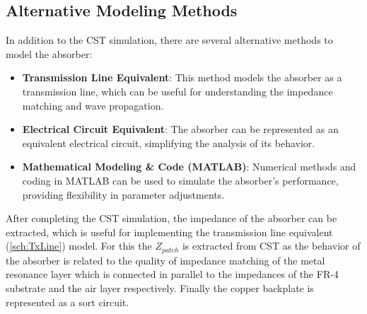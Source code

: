     \subsection{\textsf{Alternative Modeling Methods}}

        In addition to the CST simulation, there are several alternative methods
        to model the absorber:
        \begin{itemize}
            \item \textbf{Transmission Line Equivalent}: This method models the 
                absorber as a transmission line, which can be useful for 
                understanding the impedance matching and wave propagation.
            \item \textbf{Electrical Circuit Equivalent}: The absorber can be 
                represented as an equivalent electrical circuit, simplifying the
                analysis of its behavior.
            \item \textbf{Mathematical Modeling \& Code (MATLAB)}: Numerical methods
                and coding in MATLAB can be used to simulate the absorber's 
                performance, providing flexibility in parameter adjustments.
        \end{itemize}
    
        After completing the CST simulation, the impedance of the absorber can be 
        extracted, which is useful for implementing the transmission line equivalent 
        (\ref{sch:TxLine}) model. For this the $Z_{patch}$ is extracted from CST as the 
        behavior of the absorber is related to the quality of impedance matching of the
        metal resonance layer which is connected in parallel to the impedances of the 
        FR-4 substrate and the air layer respectively. Finally the copper backplate is
        represented as a sort circuit.

